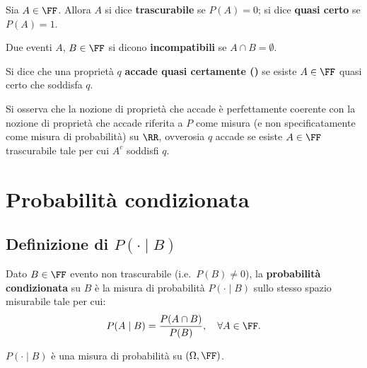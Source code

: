 \begin{multicols*}{2}
    \begin{definition}
        Sia $A \in \FF$. Allora $A$ si dice \textbf{trascurabile} se
        $P(A) = 0$; si dice \textbf{quasi certo} se $P(A) = 1$.
    \end{definition}

    \begin{definition}
        Due eventi $A$, $B \in \FF$ si dicono \textbf{incompatibili} se
        $A \cap B = \emptyset$.
    \end{definition}

    \begin{definition}[$q$ accade \qc]
        Si dice che una proprietà $q$ \textbf{accade quasi certamente (\qc)}
        se esiste $A \in \FF$ quasi certo che soddisfa
        $q$.
    \end{definition}

    \begin{remark}
        Si osserva che la nozione di proprietà che accade \qc è perfettamente
        coerente con la nozione di proprietà che accade \qc riferita a
        $P$ come misura (e non specificatamente come misura di probabilità) su $\RR$, ovverosia $q$ accade \qc se esiste
        $A \in \FF$ trascurabile tale per cui $A^c$ soddisfi $q$.
    \end{remark}

    \section{Probabilità condizionata}

    \subsection{Definizione di \texorpdfstring{$P(\cdot \mid B)$}{P(•|B)}}

    \begin{definition}
        Dato $B \in \FF$ evento non trascurabile (i.e.~$P(B) \neq 0$),
        la \textbf{probabilità condizionata} su $B$ è la misura
        di probabilità $P(\cdot \mid B)$ sullo stesso spazio misurabile
        tale per cui:
        \[
            P(A \mid B) = \frac{P(A \cap B)}{P(B)}, \quad \forall A \in \FF.
        \]
    \end{definition}

    \begin{proposition}
        $P(\cdot \mid B)$ è una misura di probabilità su $(\Omega, \FF)$.
    \end{proposition}


\end{multicols*}

